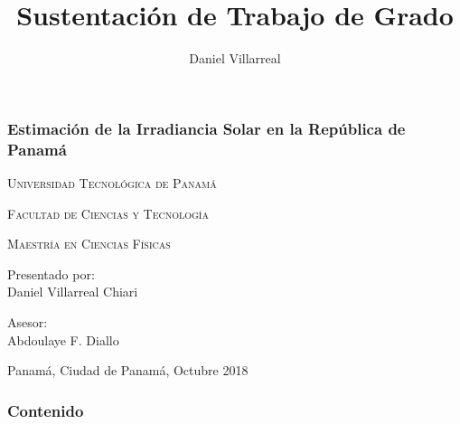 \documentclass{beamer}
\author{Daniel Villarreal}
\title{Sustentación de Trabajo de Grado}
\begin{document}
\begin{frame}
     \frametitle{Estimación de la Irradiancia Solar en la República de Panamá}
      \begin{figure}[h!]
         \centering {}
         \hspace{5cm}
         \centering {}
      \end{figure}
      \begin{center}
         {\scshape \scriptsize Universidad Tecnológica de Panamá \par}
         {\scshape \scriptsize Facultad de Ciencias y Tecnología \par}
         {\scshape \scriptsize Maestría en Ciencias Físicas \par}
         \vspace{0.3cm}
         \scriptsize Presentado por: \\
         \scriptsize Daniel Villarreal Chiari \\
         \begin{large}
            \scriptsize Asesor: \\
            \scriptsize Abdoulaye F. Diallo \\
         \end{large}
      \end{center}
\vfill
Panamá, Ciudad de Panamá, \hfill Octubre 2018
\end{frame}

\begin{frame}[t,allowframebreaks]
    \frametitle{Contenido}
    \tableofcontents
\end{frame}

\end{document}
